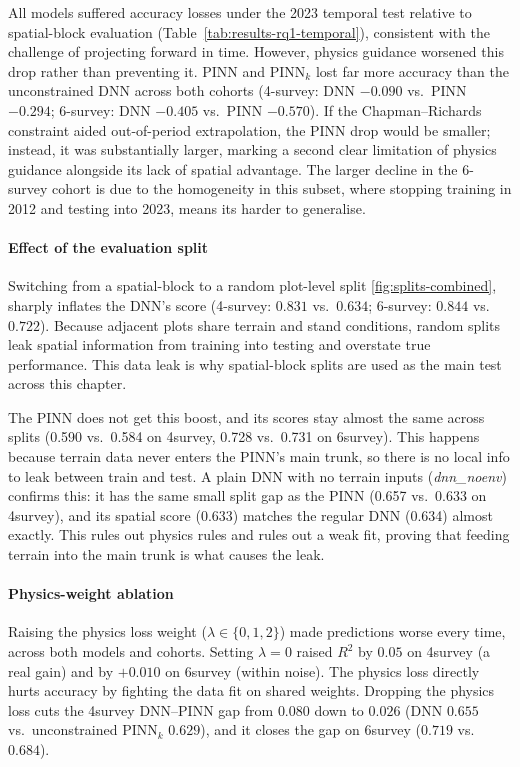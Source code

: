 \documentclass[logo,msc,ai]{infthesis}           %
\begin{document}
All models suffered accuracy losses under the 2023 temporal test relative to spatial-block evaluation (Table~\ref{tab:results-rq1-temporal}), consistent with the challenge of projecting forward in time. However, physics guidance worsened this drop rather than preventing it. PINN and PINN$_k$ lost far more accuracy than the unconstrained DNN across both cohorts (4-survey: DNN $-0.090$ vs.\ PINN $-0.294$; 6-survey: DNN $-0.405$ vs.\ PINN $-0.570$). If the Chapman–Richards constraint aided out-of-period extrapolation, the PINN drop would be smaller; instead, it was substantially larger, marking a second clear limitation of physics guidance alongside its lack of spatial advantage. The larger decline in the 6-survey cohort is due to the homogeneity in this subset, where stopping training in 2012 and testing into 2023, means its harder to generalise. 

\paragraph*{Effect of the evaluation split}
Switching from a spatial-block to a random plot-level split \ref{fig:splits-combined}, sharply inflates the DNN's score (4-survey: $0.831$ vs.\ $0.634$; 6-survey: $0.844$ vs.\ $0.722$). Because adjacent plots share terrain and stand conditions, random splits leak spatial information from training into testing and overstate true performance. This data leak is why spatial-block splits are used as the main test across this chapter.

The PINN does not get this boost, and its scores stay almost the same across splits (0.590 vs.\ 0.584 on 4survey, 0.728 vs.\ 0.731 on 6survey). This happens because terrain data never enters the PINN's main trunk, so there is no local info to leak between train and test. A plain DNN with no terrain inputs (\textit{dnn\_noenv}) confirms this: it has the same small split gap as the PINN (0.657 vs.\ 0.633 on 4survey), and its spatial score (0.633) matches the regular DNN (0.634) almost exactly. This rules out physics rules and rules out a weak fit, proving that feeding terrain into the main trunk is what causes the leak.

\paragraph*{Physics-weight ablation} Raising the physics loss weight ($\lambda \in \{0, 1, 2\}$) made predictions worse every time, across both models and cohorts. Setting $\lambda=0$ raised $R^2$ by $0.05$ on 4survey (a real gain) and by $+0.010$ on 6survey (within noise). The physics loss directly hurts accuracy by fighting the data fit on shared weights. Dropping the physics loss cuts the 4survey DNN--PINN gap from $0.080$ down to $0.026$ (DNN $0.655$ vs.\ unconstrained PINN$_k$ $0.629$), and it closes the gap on 6survey ($0.719$ vs.\ $0.684$). 
\end{document}
